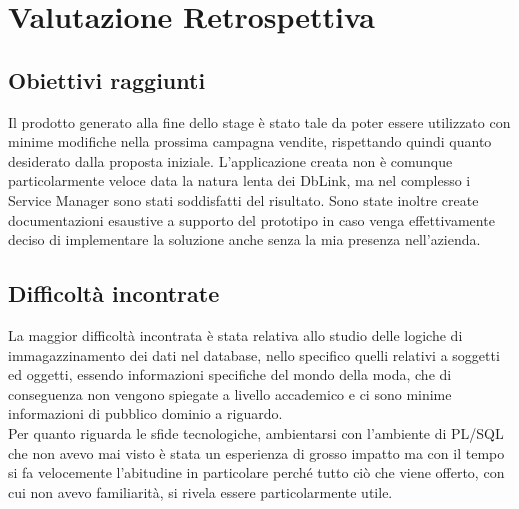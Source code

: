 \section{Valutazione Retrospettiva}
\subsection{Obiettivi raggiunti}
Il prodotto generato alla fine dello stage è stato tale da poter essere utilizzato con minime modifiche nella prossima campagna vendite, rispettando quindi quanto desiderato dalla proposta iniziale.
L'applicazione creata non è comunque particolarmente veloce data la natura lenta dei DbLink, ma nel complesso i Service Manager sono stati soddisfatti del risultato. Sono state inoltre create documentazioni esaustive a supporto del prototipo in caso venga effettivamente deciso di implementare la soluzione anche senza la mia presenza nell'azienda.\\

\subsection{Difficoltà incontrate}
La maggior difficoltà incontrata è stata relativa allo studio delle logiche di immagazzinamento dei dati nel database, nello specifico quelli relativi a soggetti ed oggetti, essendo informazioni specifiche del mondo della moda, che di conseguenza non vengono spiegate a livello accademico e ci sono minime informazioni di pubblico dominio a riguardo.\\
Per quanto riguarda le sfide tecnologiche, ambientarsi con l'ambiente di PL/SQL che non avevo mai visto è stata un esperienza di grosso impatto ma con il tempo si fa velocemente l'abitudine in particolare perché tutto ciò che viene offerto, con cui non avevo familiarità, si rivela essere particolarmente utile. 

